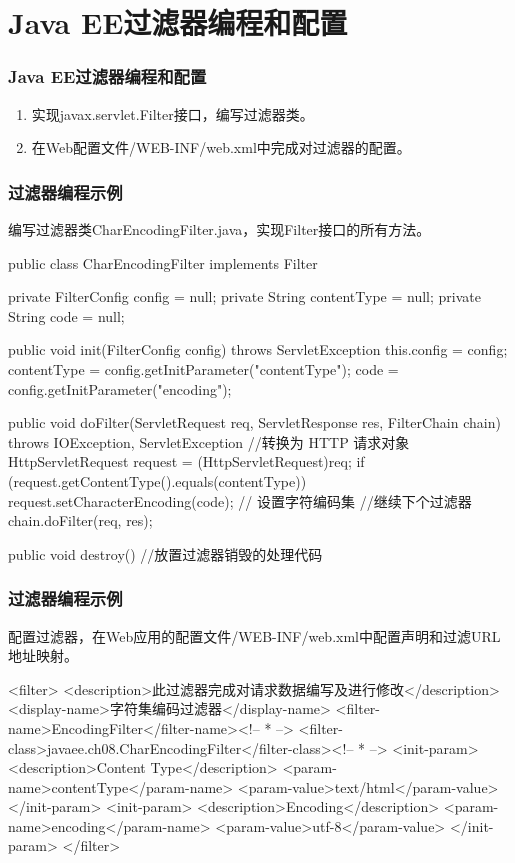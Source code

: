 \section{Java EE过滤器编程和配置}

\begin{frame}[fragile] %
\frametitle{Java EE过滤器编程和配置}
\begin{enumerate}
\item 实现javax.servlet.Filter接口，编写过滤器类。
\item 在Web配置文件/WEB-INF/web.xml中完成对过滤器的配置。
\end{enumerate}
\end{frame}

\begin{frame}[fragile] %
\frametitle{过滤器编程示例} 

编写过滤器类CharEncodingFilter.java，实现Filter接口的所有方法。

\begin{javaCode}
public class CharEncodingFilter implements Filter {
  private FilterConfig config = null;
  private String contentType = null;
  private String code = null;

  public void init(FilterConfig config) throws ServletException {
    this.config = config;
    contentType = config.getInitParameter("contentType");
    code = config.getInitParameter("encoding");
  }

  public void doFilter(ServletRequest req, ServletResponse res, FilterChain chain) 
  throws IOException, ServletException {
    //转换为 HTTP 请求对象
    HttpServletRequest request = (HttpServletRequest)req;
    if (request.getContentType().equals(contentType)) {
      request.setCharacterEncoding(code); // 设置字符编码集
    }
    //继续下个过滤器
    chain.doFilter(req, res);
  }

  public void destroy() {
    //放置过滤器销毁的处理代码
  }
}
\end{javaCode}
\end{frame}

\begin{frame}[fragile] %
\frametitle{过滤器编程示例} 

配置过滤器，在Web应用的配置文件/WEB-INF/web.xml中配置声明和过滤URL地址映射。

\begin{xmlCode}
<filter>
  <description>此过滤器完成对请求数据编写及进行修改</description>
  <display-name>字符集编码过滤器</display-name>
  <filter-name>EncodingFilter</filter-name><!-- * -->
  <filter-class>javaee.ch08.CharEncodingFilter</filter-class><!-- * -->
  <init-param>
    <description>Content Type</description>
    <param-name>contentType</param-name>
    <param-value>text/html</param-value>
  </init-param>
  <init-param>
    <description>Encoding</description>
    <param-name>encoding</param-name>
    <param-value>utf-8</param-value>
  </init-param>
</filter>
\end{xmlCode}
\end{frame}

